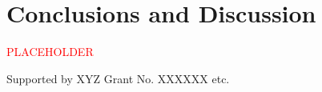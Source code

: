 \documentclass[aps,prb,showpacs,amsmath,amssymb,superscriptaddress]{revtex4-2}
\newcommand{\Red}[1]{\textcolor{red}{#1}}
\begin{document}
\section{Conclusions and Discussion}

\Red{PLACEHOLDER}


\begin{acknowledgements}
  Supported by XYZ Grant No. XXXXXX etc.
\end{acknowledgements}


%
\end{document}
